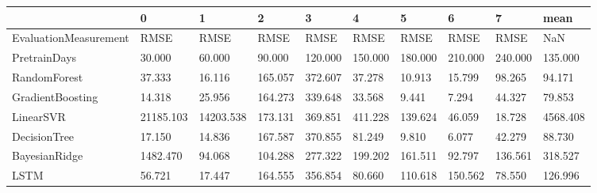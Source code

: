 \begin{tabular}{llllllllll}
\toprule
{} &         0 &         1 &       2 &       3 &       4 &       5 &       6 &       7 &     mean \\
\midrule
EvaluationMeasurement &      RMSE &      RMSE &    RMSE &    RMSE &    RMSE &    RMSE &    RMSE &    RMSE &      NaN \\
PretrainDays          &    30.000 &    60.000 &  90.000 & 120.000 & 150.000 & 180.000 & 210.000 & 240.000 &  135.000 \\
RandomForest          &    37.333 &    16.116 & 165.057 & 372.607 &  37.278 &  10.913 &  15.799 &  98.265 &   94.171 \\
GradientBoosting      &    14.318 &    25.956 & 164.273 & 339.648 &  33.568 &   9.441 &   7.294 &  44.327 &   79.853 \\
LinearSVR             & 21185.103 & 14203.538 & 173.131 & 369.851 & 411.228 & 139.624 &  46.059 &  18.728 & 4568.408 \\
DecisionTree          &    17.150 &    14.836 & 167.587 & 370.855 &  81.249 &   9.810 &   6.077 &  42.279 &   88.730 \\
BayesianRidge         &  1482.470 &    94.068 & 104.288 & 277.322 & 199.202 & 161.511 &  92.797 & 136.561 &  318.527 \\
LSTM                  &    56.721 &    17.447 & 164.555 & 356.854 &  80.660 & 110.618 & 150.562 &  78.550 &  126.996 \\
\bottomrule
\end{tabular}
